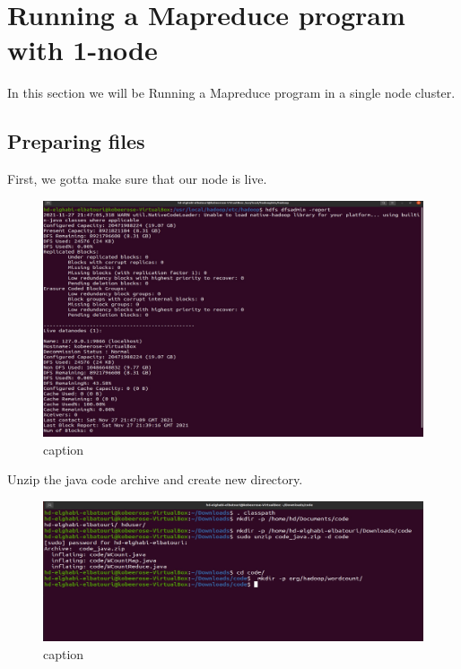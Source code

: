 \chapter{Running a Mapreduce program with 1-node}
\par In this section we will be Running a Mapreduce program in a single node cluster.
\begin{spacing}{1.2}
\section{Preparing files}

\par First, we gotta make sure that our node is live.
\\
\begin{figure}[!htb] 
\begin{center} 
\includegraphics[width=1\linewidth]{Big_Data/Hadoop/1-Node Map_Reduce/HDFS Repport.jpg} 
\end{center} 
\caption{caption} 
\end{figure} 
\FloatBarrier



\par Unzip the java code archive and create new directory.
\\
\begin{figure}[!htb] 
\begin{center} 
\includegraphics[width=1\linewidth]{Big_Data/Hadoop/1-Node Map_Reduce/Exporting jars.jpg} 
\end{center} 
\caption{caption} 
\end{figure} 
\FloatBarrier


\end{spacing}
